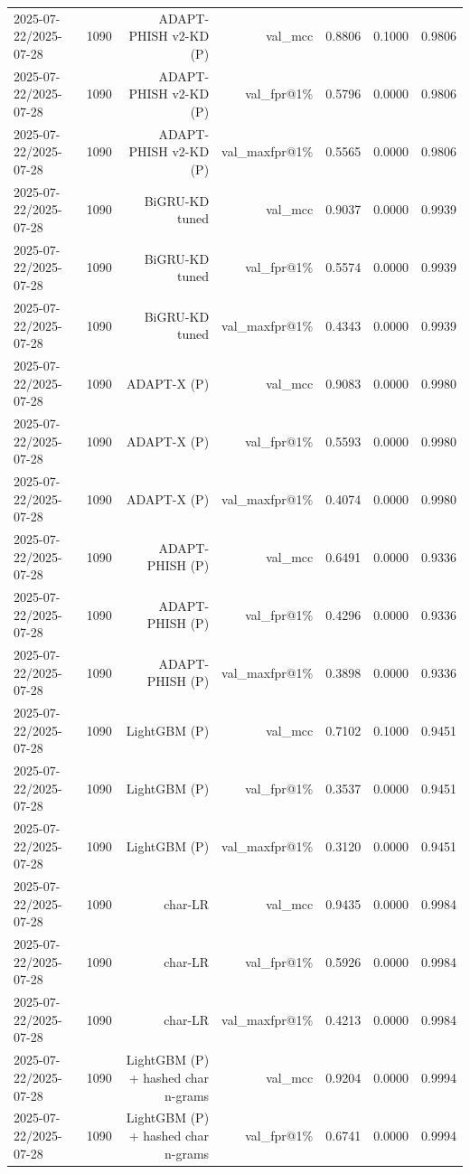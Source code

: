 \begin{table}[t]
\begin{tabular}{llrrrrr}
2025-07-22/2025-07-28 & 1090 & ADAPT-PHISH v2-KD (P) & val\_mcc & 0.8806 & 0.1000 & 0.9806 \\
2025-07-22/2025-07-28 & 1090 & ADAPT-PHISH v2-KD (P) & val\_fpr@1\% & 0.5796 & 0.0000 & 0.9806 \\
2025-07-22/2025-07-28 & 1090 & ADAPT-PHISH v2-KD (P) & val\_maxfpr@1\% & 0.5565 & 0.0000 & 0.9806 \\
2025-07-22/2025-07-28 & 1090 & BiGRU-KD tuned & val\_mcc & 0.9037 & 0.0000 & 0.9939 \\
2025-07-22/2025-07-28 & 1090 & BiGRU-KD tuned & val\_fpr@1\% & 0.5574 & 0.0000 & 0.9939 \\
2025-07-22/2025-07-28 & 1090 & BiGRU-KD tuned & val\_maxfpr@1\% & 0.4343 & 0.0000 & 0.9939 \\
2025-07-22/2025-07-28 & 1090 & ADAPT-X (P) & val\_mcc & 0.9083 & 0.0000 & 0.9980 \\
2025-07-22/2025-07-28 & 1090 & ADAPT-X (P) & val\_fpr@1\% & 0.5593 & 0.0000 & 0.9980 \\
2025-07-22/2025-07-28 & 1090 & ADAPT-X (P) & val\_maxfpr@1\% & 0.4074 & 0.0000 & 0.9980 \\
2025-07-22/2025-07-28 & 1090 & ADAPT-PHISH (P) & val\_mcc & 0.6491 & 0.0000 & 0.9336 \\
2025-07-22/2025-07-28 & 1090 & ADAPT-PHISH (P) & val\_fpr@1\% & 0.4296 & 0.0000 & 0.9336 \\
2025-07-22/2025-07-28 & 1090 & ADAPT-PHISH (P) & val\_maxfpr@1\% & 0.3898 & 0.0000 & 0.9336 \\
2025-07-22/2025-07-28 & 1090 & LightGBM (P) & val\_mcc & 0.7102 & 0.1000 & 0.9451 \\
2025-07-22/2025-07-28 & 1090 & LightGBM (P) & val\_fpr@1\% & 0.3537 & 0.0000 & 0.9451 \\
2025-07-22/2025-07-28 & 1090 & LightGBM (P) & val\_maxfpr@1\% & 0.3120 & 0.0000 & 0.9451 \\
2025-07-22/2025-07-28 & 1090 & char-LR & val\_mcc & 0.9435 & 0.0000 & 0.9984 \\
2025-07-22/2025-07-28 & 1090 & char-LR & val\_fpr@1\% & 0.5926 & 0.0000 & 0.9984 \\
2025-07-22/2025-07-28 & 1090 & char-LR & val\_maxfpr@1\% & 0.4213 & 0.0000 & 0.9984 \\
2025-07-22/2025-07-28 & 1090 & LightGBM (P) + hashed char n-grams & val\_mcc & 0.9204 & 0.0000 & 0.9994 \\
2025-07-22/2025-07-28 & 1090 & LightGBM (P) + hashed char n-grams & val\_fpr@1\% & 0.6741 & 0.0000 & 0.9994 \\

\end{tabular}
\end{table}

